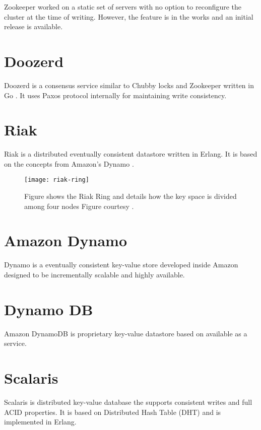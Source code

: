 Zookeeper worked on a static set of servers with no option to reconfigure the
cluster at the time of writing. However, the feature is in the works 
\citep{zab2012}and an initial release is available.

\section{Doozerd}

Doozerd \citep{doozerd} is a consensus service similar to Chubby locks
 and Zookeeper  written in 
Go \citep{golang}. It uses Paxos protocol internally for maintaining
write consistency.


\section{Riak}

Riak \citep{riak} is a distributed eventually consistent datastore written in 
Erlang. It is based on the concepts from Amazon's Dynamo \citep{DeCandia07}.

\begin{figure}
  \texttt{[image: riak-ring]}
  \caption[Riak Ring]{%
    Figure shows the Riak Ring and details how the key space is divided among 
    four nodes
    Figure courtesy \citet{riak}.}
  \label{figure:megastore}
\end{figure}


\section{Amazon Dynamo}

Dynamo \citep{DeCandia07} is a eventually consistent key-value store developed 
inside Amazon designed to be incrementally scalable and highly available.


\section{Dynamo DB}

Amazon DynamoDB \citep{dynamoDB} is proprietary key-value datastore based on
\citet{DeCandia07} available as a service.


\section{Scalaris}

Scalaris \citep{scalaris} is distributed key-value database the supports
consistent writes and full ACID properties. It is based on Distributed Hash
Table (DHT)%
and is implemented in Erlang.



